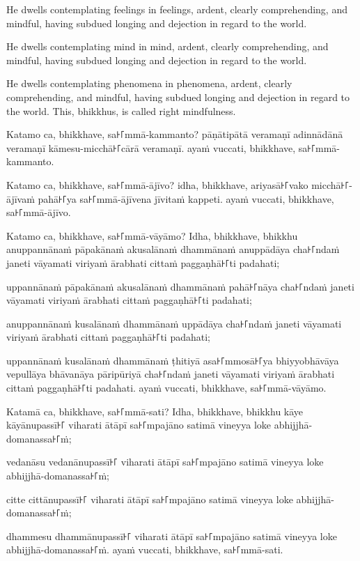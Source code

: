He dwells contemplating feelings in feelings, ardent, clearly comprehending, and
mindful, having subdued longing and dejection in regard to the world.

He dwells contemplating mind in mind, ardent, clearly comprehending, and
mindful, having subdued longing and dejection in regard to the world.

He dwells contemplating phenomena in phenomena, ardent, clearly comprehending,
and mindful, having subdued longing and dejection in regard to the world. This,
bhikkhus, is called right mindfulness.

\paliPage

Katamo ca, bhikkhave, sa꜔꜒mmā-kammanto? pāṇātipātā veramaṇī adinnādānā veramaṇī
kāmesu-micchā꜔꜒cārā veramaṇī. ayaṁ vuccati, bhikkhave, sa꜔꜒mmā-kammanto.

Katamo ca, bhikkhave, sa꜔꜒mmā-ājīvo? idha, bhikkhave, ariyasā꜔꜒vako micchā꜔꜒-ājīvaṁ
pahā꜔꜒ya sa꜔꜒mmā-ājīvena jīvitaṁ kappeti. ayaṁ vuccati, bhikkhave, sa꜔꜒mmā-ājīvo.

Katamo ca, bhikkhave, sa꜔꜒mmā-vāyāmo? Idha, bhikkhave, bhikkhu
anuppannānaṁ pāpakānaṁ akusalānaṁ dhammānaṁ
anuppādāya cha꜔꜒ndaṁ janeti vāyamati viriyaṁ ārabhati cittaṁ paggaṇhā꜔꜒ti padahati;

uppannānaṁ pāpakānaṁ akusalānaṁ dhammānaṁ
pahā꜔꜒nāya cha꜔꜒ndaṁ janeti vāyamati viriyaṁ ārabhati cittaṁ paggaṇhā꜔꜒ti padahati;

anuppannānaṁ kusalānaṁ dhammānaṁ
uppādāya cha꜔꜒ndaṁ janeti vāyamati viriyaṁ ārabhati cittaṁ paggaṇhā꜔꜒ti padahati;

uppannānaṁ kusalānaṁ dhammānaṁ
ṭhitiyā asa꜔꜒mmosā꜔꜒ya bhiyyobhāvāya vepullāya
bhāvanāya pāripūriyā cha꜔꜒ndaṁ janeti vāyamati viriyaṁ ārabhati cittaṁ paggaṇhā꜔꜒ti
padahati. ayaṁ vuccati, bhikkhave, sa꜔꜒mmā-vāyāmo.

Katamā ca, bhikkhave, sa꜔꜒mmā-sati? Idha, bhikkhave, bhikkhu kāye kāyānupassī꜔꜒
viharati ātāpī sa꜔꜒mpajāno satimā vineyya loke abhijjhā-domanassa꜔꜒ṁ;

vedanāsu vedanānupassī꜔꜒ viharati ātāpī sa꜔꜒mpajāno satimā vineyya loke
abhijjhā-domanassa꜔꜒ṁ;

\enlargethispage{\baselineskip}

citte cittānupassī꜔꜒ viharati ātāpī sa꜔꜒mpajāno satimā vineyya loke
abhijjhā-domanassa꜔꜒ṁ;

dhammesu dhammānupassī꜔꜒ viharati ātāpī sa꜔꜒mpajāno satimā vineyya loke
abhijjhā-domanassa꜔꜒ṁ. ayaṁ vuccati, bhikkhave, sa꜔꜒mmā-sati.

\englishPage

